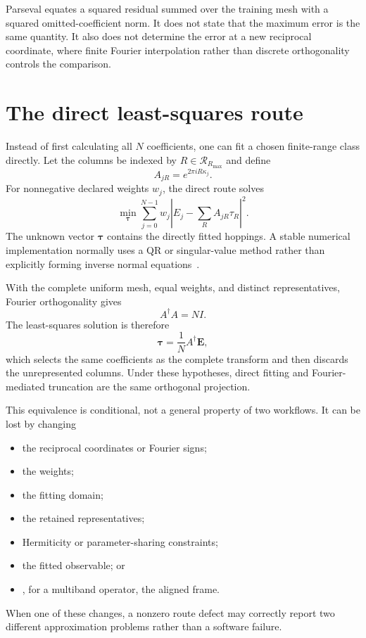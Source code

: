 Parseval equates a squared residual summed over the training mesh with a
squared omitted-coefficient norm. It does not state that the maximum error is
the same quantity. It also does not determine the error at a new reciprocal
coordinate, where finite Fourier interpolation rather than discrete
orthogonality controls the comparison.

\section{The direct least-squares route}

Instead of first calculating all $N$ coefficients, one can fit a chosen
finite-range class directly. Let the columns be indexed by
$R\in\mathcal R_{R_{\max}}$ and define
\begin{equation}
  A_{jR}=e^{2\pi iR\kappa_j}.
  \label{eq:training-isolated-design-matrix}
\end{equation}
For nonnegative declared weights $w_j$, the direct route solves
\begin{equation}
  \min_{\boldsymbol\tau}
  \sum_{j=0}^{N-1}w_j
  \left|
    E_j-\sum_R A_{jR}\tau_R
  \right|^2.
  \label{eq:training-isolated-weighted-fit}
\end{equation}
The unknown vector $\boldsymbol\tau$ contains the directly fitted hoppings. A
stable numerical implementation normally uses a QR or singular-value method
rather than explicitly forming inverse normal equations~\cite{golubVanLoan2013}.

With the complete uniform mesh, equal weights, and distinct representatives,
Fourier orthogonality gives
\begin{equation}
  A^{\dagger}A=NI.
  \label{eq:training-isolated-orthogonal-design}
\end{equation}
The least-squares solution is therefore
\begin{equation}
  \boldsymbol\tau
  =\frac1N A^{\dagger}\mathbf E,
  \label{eq:training-isolated-fit-fourier-solution}
\end{equation}
which selects the same coefficients as the complete transform and then discards
the unrepresented columns. Under these hypotheses, direct fitting and
Fourier-mediated truncation are the same orthogonal projection.

This equivalence is conditional, not a general property of two workflows. It
can be lost by changing
\begin{itemize}
  \item the reciprocal coordinates or Fourier signs;
  \item the weights;
  \item the fitting domain;
  \item the retained representatives;
  \item Hermiticity or parameter-sharing constraints;
  \item the fitted observable; or
  \item, for a multiband operator, the aligned frame.
\end{itemize}
When one of these changes, a nonzero route defect may correctly report two
different approximation problems rather than a software failure.

